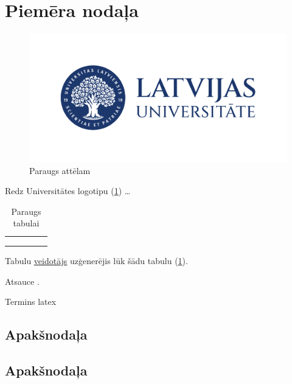 \section{Piemēra nodaļa}

\blindtext

\begin{figure}[h]
    \centering
    \includegraphics[scale=0.1]{images/LU_logotips_LAT_horiz.jpg}
    \caption{Paraugs attēlam}
    \label{fig:lu}
\end{figure}

Redz Universitātes logotipu (\ref{fig:lu}) \dots

\begin{table}[h]
    \centering
    \begin{tabular}{|l|l|l|l|l|}
        \hline
         &  &  &  & \\ \hline
         &  &  &  & \\ \hline
         &  &  &  & \\ \hline
         &  &  &  & \\ \hline
    \end{tabular}
    \caption{Paraugs tabulai}
    \label{tbl:ex}
\end{table}

Tabulu \href{https://www.tablesgenerator.com/}{veidotājs} uzģenerējis lūk šādu tabulu (\ref{tbl:ex}).

Atsauce \cite{knuthwebsite,knuth-fa}.

Termins \gls{latex}

\subsection{Apakšnodaļa}

\blindtext

\subsection{Apakšnodaļa}

\blindtext

\Blinddocument
